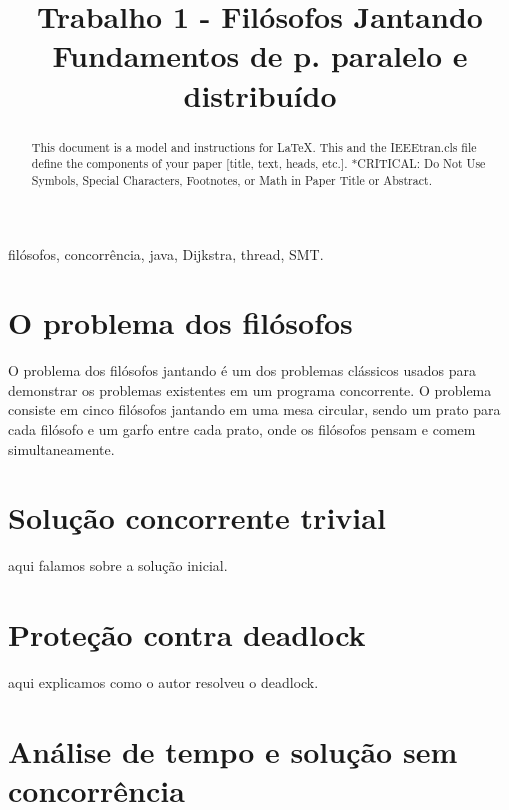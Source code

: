 \documentclass[conference]{IEEEtran}
\begin{document}
\title{Trabalho 1 - Filósofos Jantando\\Fundamentos de p. paralelo e distribuído}

\author{
}

\maketitle

\begin{abstract}
This document is a model and instructions for \LaTeX.
This and the IEEEtran.cls file define the components of your paper [title, text, heads, etc.]. *CRITICAL: Do Not Use Symbols, Special Characters, Footnotes, 
or Math in Paper Title or Abstract.
\end{abstract}

\begin{IEEEkeywords}
filósofos, concorrência, java, Dijkstra, thread, SMT.
\end{IEEEkeywords}

\section{O problema dos filósofos}

O problema dos filósofos jantando é um dos problemas clássicos usados para demonstrar os problemas existentes em um programa concorrente.
O problema consiste em cinco filósofos jantando em uma mesa circular, sendo um prato para cada filósofo e um garfo entre cada prato, onde os filósofos pensam e comem simultaneamente.
\cite{baeldung_java}

\section{Solução concorrente trivial}

aqui falamos sobre a solução inicial.

\section{Proteção contra deadlock}

aqui explicamos como o autor resolveu o deadlock.

\section{Análise de tempo e solução sem concorrência}
\end{document}
